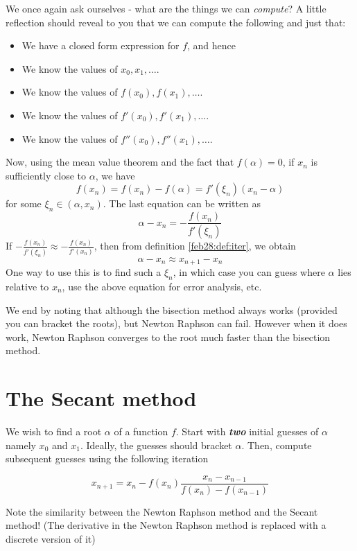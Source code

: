We once again ask ourselves - what are the things we can \textit{compute}? A little reflection should reveal to you that we can compute the following and just that:
\begin{itemize}
\item
  We have a closed form expression for $f$, and hence

\item
  We know the values of $x_0, x_1, \dots$.

\item
  We know the values of $f(x_0), f(x_1), \dots$.

\item
  We know the values of $f'(x_0), f'(x_1), \dots$.

\item
  We know the values of $f''(x_0), f''(x_1), \dots$.
\end{itemize}
Now, using the mean value theorem and the fact that $f(\alpha) = 0$, if $x_n$ is sufficiently close to $\alpha$, we have
\[
  f(x_n) = f(x_n) - f(\alpha) = f'(\xi_n)(x_n - \alpha)
\]
for some $\xi_n \in (\alpha, x_n)$. The last equation can be written as
\[
  \alpha - x_n = - \frac{f(x_n)}{f'(\xi_n)}
\]
If $- \frac{f(x_n)}{f'(\xi_n)} \approx - \frac{f(x_n)}{f'(x_n)}$, then from definition \ref{feb28:def:iter}, we obtain
\[
  \alpha - x_n \approx x_{n+1} - x_n
\]
One way to use this is to find such a $\xi_n$, in which case you can guess where $\alpha$ lies relative to $x_n$, use the above equation for error analysis, etc.

We end by noting that although the bisection method always works (provided you can bracket the roots), but Newton Raphson can fail. However when it does work, Newton Raphson converges to the root much faster than the bisection method.

\section{The Secant method}

We wish to find a root $\alpha$ of a function $f$. Start with \textbf{\textit{two}} initial guesses of $\alpha$ namely $x_0$ and $x_1$. Ideally, the guesses should bracket $\alpha$. Then, compute subsequent guesses using the following iteration
\begin{defn}
  \[
    x_{n+1} = x_n - f(x_n)\frac{x_n - x_{n-1}}{f(x_n) - f(x_{n-1})}
  \]
\end{defn}
Note the similarity between the Newton Raphson method and the Secant method! (The derivative in the Newton Raphson method is replaced with a discrete version of it)


